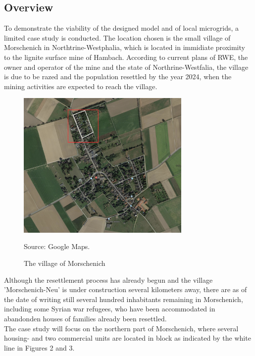 \documentclass[
	11pt,								%
	DIV10,								%
	a4paper,         					%
	oneside,							%
	headheight=20pt,					%
	footheight=20pt,					%
    parskip=full,						%
    listof=totoc,						%
	bibliography=totoc,					%
	index=totoc,						%
]{scrartcl}
\begin{document}
\subsection{Overview}
To demonstrate the viability of the designed model and of local microgrids, a limited case study is conducted. The location chosen is the small village of Morschenich in Northtrine-Westphalia, which is located in immidiate proximity to the lignite surface mine of Hambach. According to current plans of RWE, the owner and operator of the mine and the state of Northrine-Westfalia, the village is due to be razed and the population resettled by the year 2024, when the mining activities are expected to reach the village. \cite{rwepowerRahmendatenMorschenichGemeinde2018}\cite{gemeindemerzenichUmsiedlungMorschenich}
\begin{figure}[H]
	\centering
	\includegraphics[width=0.75\textwidth]{pictures/Morschenich.png}
	\caption{The village of Morschenich}
	\label{morschenich}
	\flushleft\quad\quad\footnotesize{Source: Google Maps.}
\end{figure}	
Although the resettlement process has already begun and the village 'Morschenich-Neu' is under construction several kilometers away, there are as of the date of writing still several hundred inhabitants remaining in Morschenich, including some Syrian war refugees, who have been accommodated in abandonden houses of families already been resettled.\cite{bauerAbgrundtief2018}
\\
The case study will focus on the northern part of Morschenich, where several housing- and two commercial units are located in block as indicated by the white line in Figures 2 and 3. 
\end{document}
